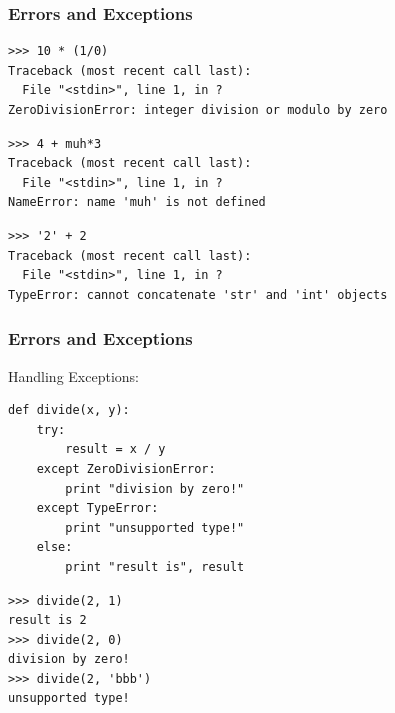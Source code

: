 \begin{frame}[fragile]
    \frametitle{Errors and Exceptions}
    \begin{myColorBox}{1.0}{}
\begin{verbatim}
>>> 10 * (1/0)
Traceback (most recent call last):
  File "<stdin>", line 1, in ?
ZeroDivisionError: integer division or modulo by zero
\end{verbatim}
    \end{myColorBox}
    \pause    
    \begin{myColorBox}{1.0}{}
\begin{verbatim}
>>> 4 + muh*3
Traceback (most recent call last):
  File "<stdin>", line 1, in ?
NameError: name 'muh' is not defined
\end{verbatim}
    \end{myColorBox}
    \pause    
    \begin{myColorBox}{1.0}{}
\begin{verbatim}
>>> '2' + 2
Traceback (most recent call last):
  File "<stdin>", line 1, in ?
TypeError: cannot concatenate 'str' and 'int' objects
\end{verbatim}
    \end{myColorBox}
\end{frame}


\begin{frame}[fragile]
    \frametitle{Errors and Exceptions}
Handling Exceptions:
    \begin{myColorBox}{1.0}{}
\begin{verbatim}
def divide(x, y):
    try:
        result = x / y
    except ZeroDivisionError:
        print "division by zero!"
    except TypeError:
        print "unsupported type!"
    else:
        print "result is", result
\end{verbatim}
    \end{myColorBox}
    \begin{myColorBox}{1.0}{}
\begin{verbatim}
>>> divide(2, 1)
result is 2
>>> divide(2, 0)
division by zero!
>>> divide(2, 'bbb')
unsupported type!
\end{verbatim}
    \end{myColorBox}
\end{frame}

